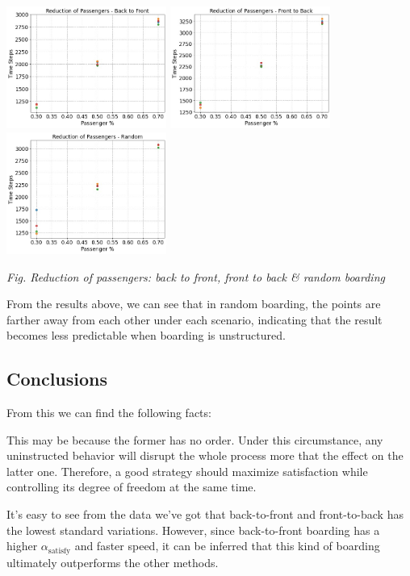 \documentclass{article}
\theoremstyle{definition}
\theoremstyle{remark}
\numberwithin{equation}{section}
\begin{document}
	\begin{center}
		\includegraphics[height = 4cm]{reduce btf.jpg}
		\includegraphics[height = 4cm]{reduce ftb.jpg}
		\includegraphics[height = 4cm]{reduce random.jpg}

		\small\textit{Fig. Reduction of passengers: back to front, front to back \& random boarding}
	\end{center}

	From the results above, we can see that in random boarding, the points are farther away from each other under each scenario, indicating that the result becomes less predictable when boarding is unstructured.
	\subsection{Conclusions}
	From this we can find the following facts:
	\begin{enumerate}

		This may be because the former has no order. Under this circumstance, any uninstructed behavior will disrupt the whole process more that the effect on the latter one. Therefore, a good strategy should maximize satisfaction while controlling its degree of freedom at the same time.

		It's easy to see from the data we've got that back-to-front and front-to-back has the lowest standard variations. However, since back-to-front boarding has a higher \(\alpha_{\mathrm{satisfy}}\) and faster speed, it can be inferred that this kind of boarding ultimately outperforms the other methods.
	\end{enumerate}
\end{document}
